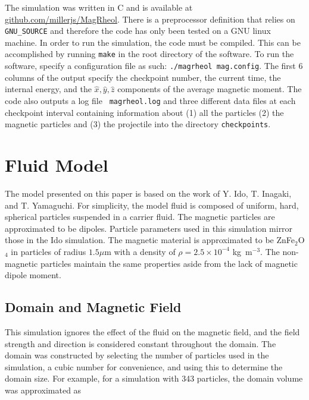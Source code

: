 The simulation was written in C and is available at
\url{github.com/millerjs/MagRheol}. There is a preprocessor definition
that relies on {\tt GNU\_SOURCE} and therefore the code has only been
tested on a GNU linux machine. In order to run the simulation, the
code must be compiled.  This can be accomplished by running {\tt make}
in the root directory of the software.  To run the software, specify a
configuration file as such: {\tt ./magrheol mag.config}.  The first 6
columns of the output specify the checkpoint number, the current time,
the internal energy, and the $\hat x, \hat y, \hat z$ components of
the average magnetic moment. The code also outputs a log file {\tt
magrheol.log} and three different data files at each checkpoint
interval containing information about (1) all the particles (2) the
magnetic particles and (3) the projectile into the directory {\tt checkpoints}.



\section*{Fluid Model}

The model presented on this paper is based on the work of Y. Ido,
T. Inagaki, and T. Yamaguchi\cite{1}.  For simplicity, the model fluid
is composed of uniform, hard, spherical particles suspended in a
carrier fluid.  The magnetic particles are approximated to be dipoles.
Particle parameters used in this simulation mirror those in the Ido
simulation. The magnetic material is approximated to be ZnFe$_2$O$_4$
in particles of radius $1.5 \mu$m with a density of $\rho = 2.5\times10^{-4}$
kg~m$^{-3}$. The non-magnetic particles maintain the same properties
aside from the lack of magnetic dipole moment.  

\subsection*{Domain and Magnetic Field}

This simulation ignores the effect of the fluid on the magnetic field,
and the field strength and direction is considered constant throughout
the domain. The domain was constructed by selecting the number of
particles used in the simulation, a cubic number for convenience, and
using this to determine the domain size. For example, for a simulation
with 343 particles, the domain volume was approximated as


